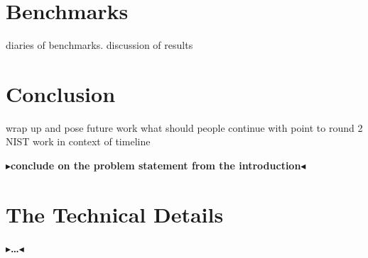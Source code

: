 \documentclass[twoside,11pt,openright]{report}
\theoremstyle{definition}
\theoremstyle{plain}
\newcommand{\todo}[1]{{\color[rgb]{.5,0,0}\textbf{$\blacktriangleright$#1$\blacktriangleleft$}}}
\begin{document}

\chapter{Benchmarks}
\label{ch:bench}
diaries of benchmarks.
discussion of results


\chapter{Conclusion}
\label{ch:conclusion}

wrap up and pose future work
what should people continue with
point to round 2 NIST
work in context of timeline

\todo{conclude on the problem statement from the introduction}


\cleardoublepage
{}




\cleardoublepage
\appendix
\chapter{The Technical Details}

\todo{\dots}
\end{document}
